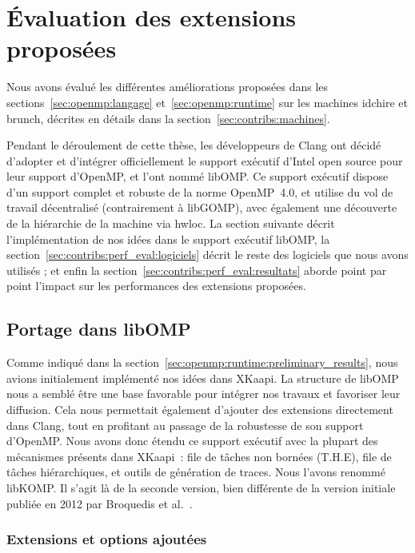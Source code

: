 \section{Évaluation des extensions proposées}\label{sec:contribs:perf_eval}


Nous avons évalué les différentes améliorations proposées dans les sections~\ref{sec:openmp:langage} et~\ref{sec:openmp:runtime} sur les machines idchire et brunch, décrites en détails dans la section~\ref{sec:contribs:machines}.

Pendant le déroulement de cette thèse, les développeurs de Clang ont décidé d'adopter et d'intégrer officiellement le support exécutif d'Intel open source pour leur support d'OpenMP, et l'ont nommé libOMP.
Ce support exécutif dispose d'un support complet et robuste de la norme OpenMP~4.0, et utilise du vol de travail décentralisé (contrairement à libGOMP), avec également une découverte de la hiérarchie de la machine via hwloc.
La section suivante décrit l'implémentation de nos idées dans le support exécutif libOMP, la section~\ref{sec:contribs:perf_eval:logiciels} décrit le reste des logiciels que nous avons utilisés ; et enfin la section~\ref{sec:contribs:perf_eval:resultats} aborde point par point l'impact sur les performances des extensions proposées.

\subsection{Portage dans libOMP}\label{sec:contribs:perf_eval:libkomp}

Comme indiqué dans la section~\ref{sec:openmp:runtime:preliminary_results}, nous avions initialement implémenté nos idées dans XKaapi.
La structure de libOMP nous a semblé être une base favorable pour intégrer nos travaux et favoriser leur diffusion.
Cela nous permettait également d'ajouter des extensions directement dans Clang, tout en profitant au passage de la robustesse de son support d'OpenMP.
Nous avons donc étendu ce support exécutif avec la plupart des mécanismes présents dans XKaapi~: file de tâches non bornées (T.H.E), file de tâches hiérarchiques, et outils de génération de traces.
Nous l'avons renommé libKOMP.
Il s'agit là de la seconde version, bien différente de la version initiale publiée en 2012 par Broquedis et al.~\cite{Broquedis2012}.

\subsubsection{Extensions et options ajoutées}
\label{sec:contribs:perf_eval:portage_libkomp}

